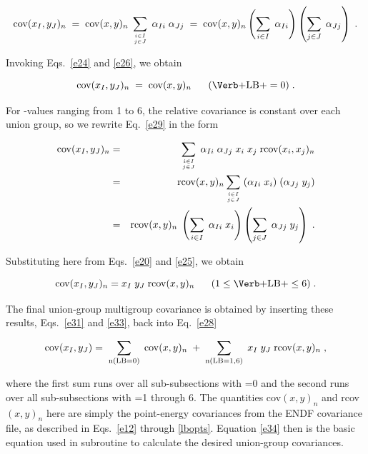 \begin{equation} {\rm {\rm cov}} (x_I,y_J)_n\; = \; {\rm {\rm cov}} (x,y)_n
\; \sum_{i\in I\atop{j\in J}} \; \alpha_{Ii} \; \alpha_{Jj} \; = \;
  {\rm {\rm cov}} (x,y)_n
\left(\sum_{i\in I} \; \alpha_{Ii} \right) \left(\sum_{j\in J} \;
  \alpha_{Jj}\right) \; .
\end{equation}

\noindent
Invoking Eqs.~\ref{e24} and \ref{e26}, we obtain

\begin{equation}
{\rm cov}(x_I , y_J)_n \;=\; {\rm cov}(x,y)_n \; \;\;\;\;\;
  (\hbox{\cword{LB}} = 0) \;.
\label{e31}
\end{equation}

\noindent
For -values ranging from 1 to 6, the relative covariance is
constant over each union group, so we rewrite Eq.~\ref{e29} in the form

\begin{eqnarray}
{\rm {\rm cov}} (x_I,y_J)_n & = & \sum_{i\in I\atop{j\in J}}\; \alpha_{Ii}\;
  \alpha_{Jj} \; x_i \; x_j \;
{\rm r{\rm cov}} (x_i , x_j)_n \nonumber \\
  & = &{\rm r{\rm cov}} (x,y)_n \sum_{i\in I\atop{j\in J}}\;
 (\alpha_{Ii}\; x_i ) \; (\alpha_{Jj} \; y_j) \nonumber \\
  & = & {\rm rcov} (x,y)_n \; \left(\sum_{i\in I} \; \alpha_{Ii} \;
  x_i \right) \left(\sum_{j\in J}\; \alpha_{Jj} \; y_j \right) \; .
\label{e32}
\end{eqnarray}

\noindent
Substituting here from Eqs.~\ref{e20} and \ref{e25}, we obtain

\begin{equation}
{\rm {\rm cov}} (x_I , y_J)_n = x_I\; y_J \; {\rm r{\rm cov}} (x,y)_n
  \;\;\;\;\;\; (1
\leq\hbox{\cword{LB}}\leq 6)\; .
\label{e33}
\end{equation}

\noindent
The final union-group multigroup covariance is obtained by inserting
these results, Eqs.~\ref{e31} and \ref{e33}, back into Eq.~\ref{e28}

\begin{equation} {\rm cov} (x_I,y_J) = \; \sum_{\rm n(LB=0)}  \;
{\rm cov} (x,y)_n \;+\; \sum_{\rm  n(LB=1,6)}  \;x_I\;y_J
\; {\rm r{\rm cov}} (x,y)_n\;,
\label{e34}
\end{equation}
\vspace{1 pt}

\noindent
where the first sum runs over all sub-subsections with =0 and
the second runs over all sub-subsections with =1 through 6.  The
quantities cov$(x,y)_n$ and r{\rm cov}$(x,y)_n$ here
are simply the point-energy covariances from the ENDF covariance file,
as described in Eqs.~\ref{e12} through \ref{lbopts}.  Equation \ref{e34}
then is the basic equation used in subroutine  to
calculate the desired union-group covariances.

